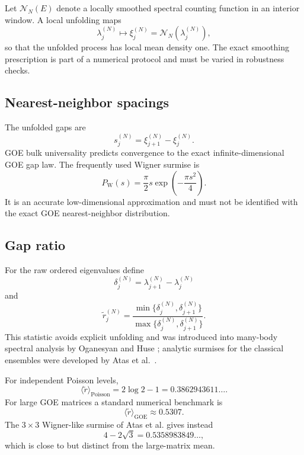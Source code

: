\documentclass[11pt]{amsart}
\numberwithin{equation}{section}
\theoremstyle{plain}
\theoremstyle{definition}
\theoremstyle{remark}
\newcommand{\GOE}{\mathrm{GOE}}
\newcommand{\Poisson}{\mathrm{Poisson}}
\begin{document}
Let $\mathcal N_N(E)$ denote a locally smoothed spectral counting function in an interior window.  A local unfolding maps
\begin{equation}
\lambda_j^{(N)}\longmapsto
\xi_j^{(N)}=\mathcal N_N\!\left(\lambda_j^{(N)}\right),
\label{eq:local_unfolding}
\end{equation}
so that the unfolded process has local mean density one.  The exact smoothing prescription is part of a numerical protocol and must be varied in robustness checks.

\subsection{Nearest-neighbor spacings}
\label{subsec:nearest_neighbor}

The unfolded gaps are
\begin{equation}
s_j^{(N)}=\xi_{j+1}^{(N)}-\xi_j^{(N)}.
\label{eq:unfolded_gap}
\end{equation}
GOE bulk universality predicts convergence to the exact infinite-dimensional GOE gap law.  The frequently used Wigner surmise is
\begin{equation}
P_{\mathrm W}(s)
=
\frac{\pi}{2}s\exp\!\left(-\frac{\pi s^2}{4}\right).
\label{eq:wigner_surmise}
\end{equation}
It is an accurate low-dimensional approximation and must not be identified with the exact GOE nearest-neighbor distribution.

\subsection{Gap ratio}
\label{subsec:gap_ratio}

For the raw ordered eigenvalues define
\begin{equation}
\delta_j^{(N)}=\lambda_{j+1}^{(N)}-\lambda_j^{(N)}
\label{eq:raw_gap}
\end{equation}
and
\begin{equation}
\widetilde r_j^{(N)}
=
\frac{\min\{\delta_j^{(N)},\delta_{j+1}^{(N)}\}}
{\max\{\delta_j^{(N)},\delta_{j+1}^{(N)}\}}.
\label{eq:ratio_statistic}
\end{equation}
This statistic avoids explicit unfolding and was introduced into many-body spectral analysis by Oganesyan and Huse \cite{OganesyanHuse2007}; analytic surmises for the classical ensembles were developed by Atas et al.\ \cite{Atas2013}.

For independent Poisson levels,
\begin{equation}
\langle\widetilde r\rangle_{\Poisson}
=2\log 2-1
=0.3862943611\ldots.
\label{eq:poisson_gap_ratio}
\end{equation}
For large GOE matrices a standard numerical benchmark is
\begin{equation}
\langle\widetilde r\rangle_{\GOE}\approx0.5307.
\label{eq:goe_gap_ratio}
\end{equation}
The $3\times3$ Wigner-like surmise of Atas et al. gives instead
\begin{equation}
4-2\sqrt3=0.5358983849\ldots,
\label{eq:atas_gap_ratio}
\end{equation}
which is close to but distinct from the large-matrix mean.
\end{document}
